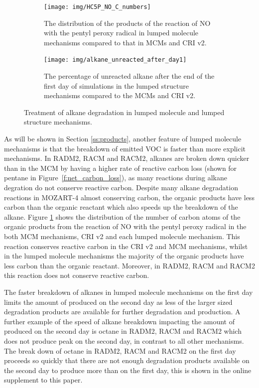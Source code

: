 %
\begin{figure}
    \centering
    \begin{subfigure}[b]{0.4\textwidth}
        \texttt{[image: img/HC5P\_NO\_C\_numbers]}
        \caption{The distribution of the products of the reaction of NO with the pentyl peroxy radical in lumped molecule mechanisms compared to that in MCMs and CRI v2.}
        \label{f:HC5P_NO}
    \end{subfigure}
    \hspace{1cm}
    \begin{subfigure}[b]{0.4\textwidth}
        \texttt{[image: img/alkane\_unreacted\_after\_day1]}
        \caption{The percentage of unreacted alkane after the end of the first day of simulations in the lumped structure mechanisms compared to the MCMs and CRI v2.}
        \label{f:Unreacted_PAR}
    \end{subfigure}
    \vspace{3mm}
    \caption{Treatment of alkane degradation in lumped molecule and lumped structure mechanisms.}
    \vspace{-4mm}
    \label{f:alkanes}
\end{figure}
%
As will be shown in Section \ref{ss:products}, another feature of lumped molecule mechanisms is that the breakdown of emitted VOC is faster than more explicit mechanisms.
In RADM2, RACM and RACM2, alkanes are broken down quicker than in the MCM by having a higher rate of reactive carbon loss (shown for pentane in \mbox{Figure \ref{f:net_carbon_loss}}), as many reactions during alkane degration do not conserve reactive carbon.
Despite many alkane degradation reactions in MOZART-4 almost conserving carbon, the organic products have less carbon than the organic reactant which also speeds up the breakdown of the alkane.
Figure \ref{f:HC5P_NO} shows the distribution of the number of carbon atoms of the organic products from the reaction of NO with the pentyl peroxy radical in the both MCM mechanisms, CRI v2 and each lumped molecule mechanism.
This reaction conserves reactive carbon in the CRI v2 and MCM mechanisms,  whilst in the lumped molecule mechanisms the majority of the organic products have less carbon than the organic reactant.
Moreover, in RADM2, RACM and RACM2 this reaction does not conserve reactive carbon.  

The faster breakdown of alkanes in lumped molecule mechanisms on the first day limits the amount of  produced on the second day as less of the larger sized degradation products are available for further degradation and  production.  
A further example of the speed of alkane breakdown impacting the amount of  produced on the second day is octane in RADM2, RACM and RACM2 which does not produce peak  on the second day, in contrast to all other mechanisms.
The break down of octane in RADM2, RACM and RACM2 on the first day proceeds so quickly that there are not enough degradation products available on the second day to produce more  than on the first day, this is shown in the online supplement to this paper.

